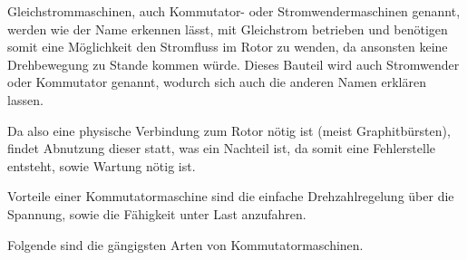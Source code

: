 Gleichstrommaschinen, auch Kommutator- oder Stromwendermaschinen genannt, werden wie der Name erkennen lässt, mit Gleichstrom betrieben und benötigen somit eine Möglichkeit den Stromfluss im Rotor zu wenden, da ansonsten keine Drehbewegung zu Stande kommen würde. 
Dieses Bauteil wird auch Stromwender oder Kommutator genannt, wodurch sich auch die anderen Namen erklären lassen.

Da also eine physische Verbindung zum Rotor nötig ist (meist Graphitbürsten), findet Abnutzung dieser statt, was ein Nachteil ist, da somit eine Fehlerstelle entsteht, sowie Wartung nötig ist.

Vorteile einer Kommutatormaschine sind die einfache Drehzahlregelung über die Spannung, sowie die Fähigkeit unter Last anzufahren.

Folgende sind die gängigsten Arten von Kommutatormaschinen.

\cite{dcdewiki:208635995}